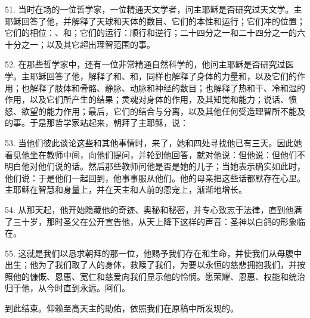 51. 当时在场的一位哲学家，一位精通天文学者，问主耶稣是否研究过天文学。主耶稣回答了他，并解释了天球和天体的数目、它们的本性和运行；它们冲的位置；它们的相位：、和；它们的运行：顺行和逆行；二十四分之一和二十四分之一的六十分之一；以及其它超出理智范围的事。\par

52. 在那些哲学家中，还有一位非常精通自然科学的，他问主耶稣是否研究过医学。主耶稣回答了他，解释了和、和，同样也解释了身体的力量和，以及它们的作用；也解释了肢体和骨骼、静脉、动脉和神经的数目；也解释了热和干、冷和湿的作用，以及它们所产生的结果；灵魂对身体的作用，及其知觉和能力；说话、愤怒、欲望的能力作用；最后，它们的结合与分离，以及其他任何受造理智所不能及的事。于是那哲学家站起来，朝拜了主耶稣，说：\par

53. 当他们彼此谈论这些和其他事情时，来了，她和四处寻找他已有三天。因此她看见他坐在教师中间，向他们提问，并轮到他回答，就对他说：但他说：但他们不明白他对他们说的话。然后那些教师问他是否是她的儿子；当她表示确实如此时，他们说：于是他们一起回到，他事事服从他们。他的母亲把这些话都默存在心里。主耶稣在智慧和身量上，并在天主和人前的恩宠上，渐渐地增长。\par

54. 从那天起，他开始隐藏他的奇迹、奥秘和秘密，并专心致志于法律，直到他满了三十岁，那时圣父在公开宣告他，从天上降下这样的声音：圣神以白鸽的形象临在。\par

55. 这就是我们以恳求朝拜的那一位，他赐予我们存在和生命，并使我们从母腹中出生；他为了我们取了人的身体，救赎了我们，为要以永恒的慈悲拥抱我们，并按照他的慷慨、恩惠、宽仁和慈爱向我们显示他的怜悯。愿荣耀、恩惠、权能和统治归于他，从今时直到永远。阿们。\par

到此结束。仰赖至高天主的助佑，依照我们在原稿中所发现的。\par

